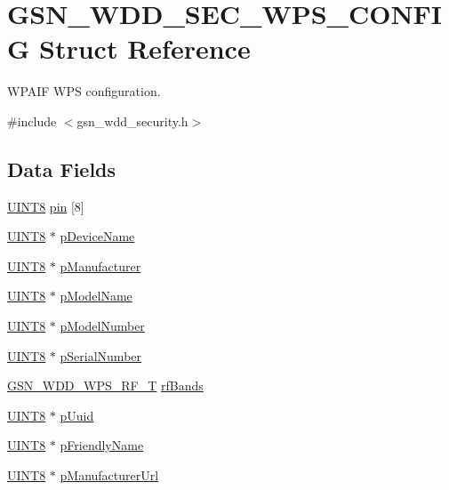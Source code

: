 \hypertarget{a00296}{
\section{GSN\_\-WDD\_\-SEC\_\-WPS\_\-CONFIG Struct Reference}
\label{a00296}
}


WPAIF WPS configuration.  




{\ttfamily \#include $<$gsn\_\-wdd\_\-security.h$>$}

\subsection*{Data Fields}
\begin{DoxyCompactItemize}
\item 
\hyperlink{a00660_gab27e9918b538ce9d8ca692479b375b6a}{UINT8} \hyperlink{a00296_ad4be93120a175f6630af23503a0a8c3c}{pin} \mbox{[}8\mbox{]}
\item 
\hyperlink{a00660_gab27e9918b538ce9d8ca692479b375b6a}{UINT8} $\ast$ \hyperlink{a00296_a0690be2839815861009b4509a038fe1a}{pDeviceName}
\item 
\hyperlink{a00660_gab27e9918b538ce9d8ca692479b375b6a}{UINT8} $\ast$ \hyperlink{a00296_ac4d49e4679a63d847dcfbf72a54c43cf}{pManufacturer}
\item 
\hyperlink{a00660_gab27e9918b538ce9d8ca692479b375b6a}{UINT8} $\ast$ \hyperlink{a00296_a5466054ddbc5ae79c989aa024d95d5b1}{pModelName}
\item 
\hyperlink{a00660_gab27e9918b538ce9d8ca692479b375b6a}{UINT8} $\ast$ \hyperlink{a00296_a8cf499260c5308598ec0ebf2833648eb}{pModelNumber}
\item 
\hyperlink{a00660_gab27e9918b538ce9d8ca692479b375b6a}{UINT8} $\ast$ \hyperlink{a00296_a22ea7e7af119a5bf1946646753205fd5}{pSerialNumber}
\item 
\hyperlink{a00604_a68fdeea2986eb4735ca5fcd6f45d3d1c}{GSN\_\-WDD\_\-WPS\_\-RF\_\-T} \hyperlink{a00296_a17421dd2bb895ce242cf45673a019a4a}{rfBands}
\item 
\hyperlink{a00660_gab27e9918b538ce9d8ca692479b375b6a}{UINT8} $\ast$ \hyperlink{a00296_ac9629a29e7c03e9f6c8b93e2e31c4ca7}{pUuid}
\item 
\hyperlink{a00660_gab27e9918b538ce9d8ca692479b375b6a}{UINT8} $\ast$ \hyperlink{a00296_a4e03d5ecd56303e62d97a9d17fecbef3}{pFriendlyName}
\item 
\hyperlink{a00660_gab27e9918b538ce9d8ca692479b375b6a}{UINT8} $\ast$ \hyperlink{a00296_ad8596c9cecbf3e023608c67be2595c94}{pManufacturerUrl}

\end{DoxyCompactItemize}
